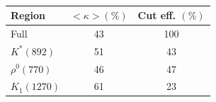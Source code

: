 	\begin{table}[h]
			\caption{}	
  \footnotesize
  \centering
  \begin{tabular}
    {l c c }
    \hline \hline
    Region &  $<\kappa> (\%)$   &  Cut eff. $(\%)$ \\   \hline
    Full & 43 &  100 \\
    $K^*(892)$ & 51    &  43  \\
    $\rho^0(770)$ & 46  & 47   \\
    $K_1(1270)$ & 61   & 23  \\
    \hline \hline
  \end{tabular}
  \label{tab:sideband}
\end{table}


%
%

